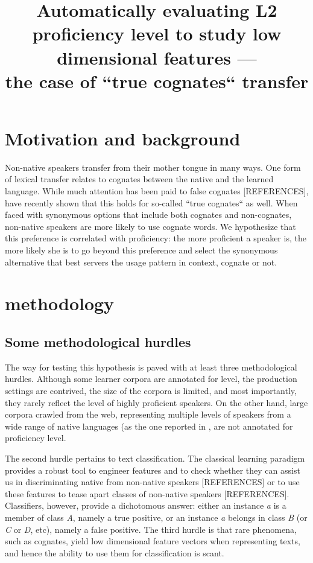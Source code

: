 \documentclass[11pt]{article}
\title{Automatically evaluating L2 proficiency level to study low dimensional features --- \\ the case of ``true cognates`` transfer}
\begin{document}
	\maketitle
	\thispagestyle{empty}

\section{Motivation and background}
Non-native speakers transfer from their mother tongue in many ways. One form of lexical transfer relates to cognates between the native and the learned language. While much attention has been paid to false cognates [REFERENCES], \cite{ella-cognates} have recently shown that this holds for so-called ``true cognates`` as well. When faced with synonymous options that include both cognates and non-cognates, non-native speakers are more likely to use cognate words. We hypothesize that this preference is correlated with proficiency: the more proficient a speaker is, the more likely she is to go beyond this preference and select the synonymous alternative that best servers the usage pattern in context, cognate or not.  


\section{methodology}
\subsection{Some methodological hurdles}

The way for testing this hypothesis is paved with at least three methodological hurdles. Although some learner corpora are annotated for level, the production settings are contrived, the size of the corpora is limited, and most importantly, they rarely reflect the level of highly proficient speakers. On the other hand, large corpora crawled from the web, representing multiple levels of speakers from a wide range of native languages (as the one reported in \citep{goldin2018native}, are not annotated for proficiency level. 

The second hurdle pertains to text classification. The classical learning paradigm provides a robust tool to engineer features and to check whether they can assist us in discriminating native from non-native speakers [REFERENCES] or to use these features to tease apart classes of non-native speakers [REFERENCES]. Classifiers, however, provide a dichotomous answer: either an instance \emph{a} is a member of class \emph{A}, namely a true positive, or an instance \emph{a} belongs in class \emph{B} (or \emph{C} or \emph{D}, etc), namely a false positive. The third hurdle is that rare phenomena, such as cognates, yield low dimensional feature vectors when representing texts, and hence the ability to use them for classification is scant.   
\end{document}
